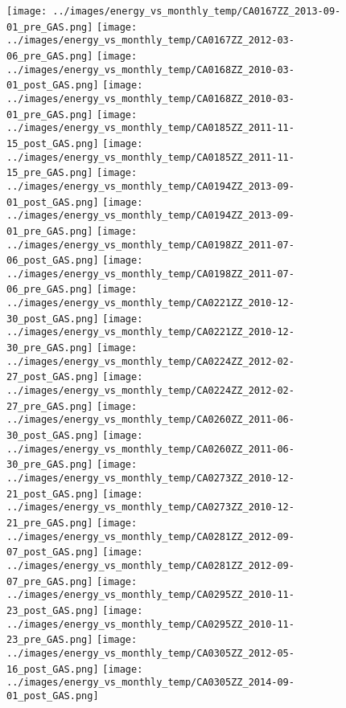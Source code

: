 \clearpage
\begin{figure}
\centering
\texttt{[image: ../images/energy\_vs\_monthly\_temp/CA0167ZZ\_2013-09-01\_pre\_GAS.png]}
\texttt{[image: ../images/energy\_vs\_monthly\_temp/CA0167ZZ\_2012-03-06\_pre\_GAS.png]}
\texttt{[image: ../images/energy\_vs\_monthly\_temp/CA0168ZZ\_2010-03-01\_post\_GAS.png]}
\texttt{[image: ../images/energy\_vs\_monthly\_temp/CA0168ZZ\_2010-03-01\_pre\_GAS.png]}
\texttt{[image: ../images/energy\_vs\_monthly\_temp/CA0185ZZ\_2011-11-15\_post\_GAS.png]}
\texttt{[image: ../images/energy\_vs\_monthly\_temp/CA0185ZZ\_2011-11-15\_pre\_GAS.png]}
\texttt{[image: ../images/energy\_vs\_monthly\_temp/CA0194ZZ\_2013-09-01\_post\_GAS.png]}
\texttt{[image: ../images/energy\_vs\_monthly\_temp/CA0194ZZ\_2013-09-01\_pre\_GAS.png]}
\texttt{[image: ../images/energy\_vs\_monthly\_temp/CA0198ZZ\_2011-07-06\_post\_GAS.png]}
\texttt{[image: ../images/energy\_vs\_monthly\_temp/CA0198ZZ\_2011-07-06\_pre\_GAS.png]}
\texttt{[image: ../images/energy\_vs\_monthly\_temp/CA0221ZZ\_2010-12-30\_post\_GAS.png]}
\texttt{[image: ../images/energy\_vs\_monthly\_temp/CA0221ZZ\_2010-12-30\_pre\_GAS.png]}
\texttt{[image: ../images/energy\_vs\_monthly\_temp/CA0224ZZ\_2012-02-27\_post\_GAS.png]}
\texttt{[image: ../images/energy\_vs\_monthly\_temp/CA0224ZZ\_2012-02-27\_pre\_GAS.png]}
\texttt{[image: ../images/energy\_vs\_monthly\_temp/CA0260ZZ\_2011-06-30\_post\_GAS.png]}
\texttt{[image: ../images/energy\_vs\_monthly\_temp/CA0260ZZ\_2011-06-30\_pre\_GAS.png]}
\texttt{[image: ../images/energy\_vs\_monthly\_temp/CA0273ZZ\_2010-12-21\_post\_GAS.png]}
\texttt{[image: ../images/energy\_vs\_monthly\_temp/CA0273ZZ\_2010-12-21\_pre\_GAS.png]}
\texttt{[image: ../images/energy\_vs\_monthly\_temp/CA0281ZZ\_2012-09-07\_post\_GAS.png]}
\texttt{[image: ../images/energy\_vs\_monthly\_temp/CA0281ZZ\_2012-09-07\_pre\_GAS.png]}
\texttt{[image: ../images/energy\_vs\_monthly\_temp/CA0295ZZ\_2010-11-23\_post\_GAS.png]}
\texttt{[image: ../images/energy\_vs\_monthly\_temp/CA0295ZZ\_2010-11-23\_pre\_GAS.png]}
\texttt{[image: ../images/energy\_vs\_monthly\_temp/CA0305ZZ\_2012-05-16\_post\_GAS.png]}
\texttt{[image: ../images/energy\_vs\_monthly\_temp/CA0305ZZ\_2014-09-01\_post\_GAS.png]}
\end{figure}

